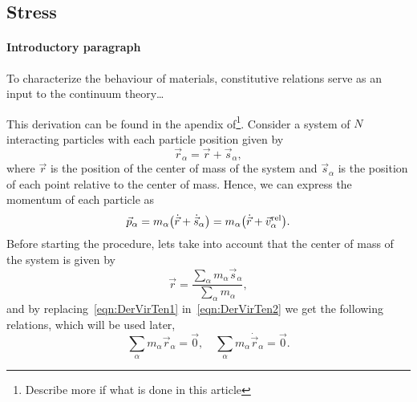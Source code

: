 \documentclass[../../main-notes.tex]{subfiles}
\begin{document}
\subsection{Stress}

\paragraph{Introductory paragraph} To characterize the behaviour of materials, constitutive relations serve as an input to the continuum theory\dots

This derivation can be found in the apendix of\citep{admalUnifiedInterpretationStress2010}\footnote{Describe more if what is done in this article}.
Consider a system of $N$ interacting particles with each particle position given by
\begin{equation}
    \vec{r}_{\alpha} = \vec{r} + \vec{s}_{\alpha}\label{eqn:DerVirTen1},
\end{equation}
where $\vec{r}$ is the position of the center of mass of the system and $\vec{s}_\alpha$ is the position of each point relative to the center of mass.
Hence, we can express the momentum of each particle as
\begin{equation}
    \vec{p}_\alpha = m_\alpha\qty(\dot{\vec{r}}+\dot{\vec{s}}_\alpha) = m_\alpha\qty(\dot{\vec{r}}+\vec{v}_\alpha^{\mathrm{rel}}).\label{eqn:DerVirTen2}
\end{equation}
Before starting the procedure, lets take into account that the center of mass of the system is given by
\begin{equation}
    \vec{r} = \frac{\sum_{\alpha}m_\alpha\vec{s}_\alpha}{\sum_{\alpha}m_\alpha}\label{eqn:DerVirTen3},
\end{equation}
and by replacing~\eqref{eqn:DerVirTen1} in~\eqref{eqn:DerVirTen2} we get the following relations, which will be used later,
\begin{equation}
    \sum_\alpha m_\alpha\vec{r}_\alpha = \vec{0},\quad
    \sum_\alpha m_\alpha\dot{\vec{r}}_\alpha = \vec{0}.\label{eqn:DerVirTen4}
\end{equation}
\end{document}
